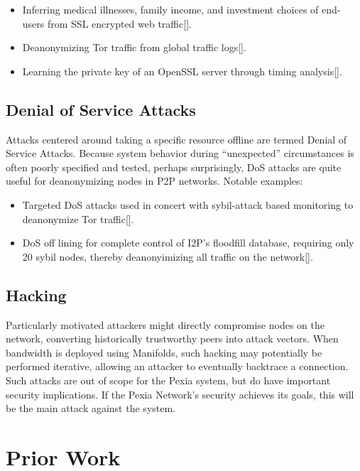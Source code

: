 \documentclass{article}
\newcommand{\mesh}{Pexia}
\begin{document}
\begin{itemize}
    \item Inferring medical illnesses, family income, and investment choices of end- users from SSL encrypted web traffic[\cite{broadInferenceAttacks}].
    \item Deanonymizing Tor traffic from global traffic logs[\cite{mixTrafficAnalysis}].
    \item Learning the private key of an OpenSSL server through timing analysis[\cite{opensslTimingAttack}].
\end{itemize}

\subsection{Denial of Service Attacks}

Attacks centered around taking a specific resource offline are termed Denial of Service Attacks. Because system behavior during “unexpected” circumstances is often poorly specified and tested, perhaps surprisingly, DoS attacks are quite useful for deanonymizing nodes in P2P networks. Notable examples:

\begin{itemize}
    \item Targeted DoS attacks used in concert with sybil-attack based monitoring to deanonymize Tor traffic[\cite{DOSvsSec}].
    \item DoS off lining for complete control of I2P’s floodfill database, requiring only 20 sybil nodes, thereby deanonyimizing all traffic on the network[\cite{I2P-vigna}].
\end{itemize}

\subsection{Hacking}

Particularly motivated attackers might directly compromise nodes on the network, converting historically trustworthy peers into attack vectors. When bandwidth is deployed using Manifolds, such hacking may potentially be performed iterative, allowing an attacker to eventually backtrace a connection. Such attacks are out of scope for the \mesh{} system, but do have important security implications. If the \mesh{} Network's security achieves its goals, this will be the main attack against the system.


\section{Prior Work}
\label{sec:prior-work}
\end{document}
